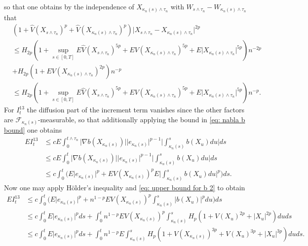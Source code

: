 \documentclass{article}
\begin{document}
so that one obtains by the independence of $X_{\kappa_n(s)\wedge \tau_n}$ with $W_{s\wedge  \tau_n}-W_{\kappa_n(s)\wedge \tau_n}$ that
\begin{align}\label{eq: increment bound V hat}
   &(1+\hat{V}(X_{s\wedge  \tau_n})^p+\hat{V}(X_{\kappa_n(s)\wedge  \tau_n})^p)\lvert X_{s\wedge  \tau_n}-X_{\kappa_n(s)\wedge \tau_n}\rvert^{2p} \nonumber \\
   &\leq H_{2p}(1+\sup_{s\in [0,T]}E\hat{V}(X_{s\wedge  \tau_n})^{5p}+EV(X_{\kappa_n(s)\wedge \tau_n})^{5p}+E\lvert X_{\kappa_n(s)\wedge \tau_n}\rvert^{5p})n^{-2p}\nonumber \\
   &+H_{2p}(1+EV(X_{\kappa_n(s)\wedge \tau_n})^{2p})n^{-p} \nonumber \\
   &\leq H_{2p}(1+\sup_{s\in [0,T]}E\hat{V}(X_{s\wedge  \tau_n})^{5p}+EV(X_{\kappa_n(s)\wedge \tau_n})^{5p}+E\lvert X_{\kappa_n(s)\wedge \tau_n}\rvert^{5p})n^{-p}.
\end{align}
For $I^{13}_t$ the diffusion part of the increment term vanishes since the other factors are $\mathcal{F}_{\kappa_n(s)}$-measurable, so that additionally applying the bound in \eqref{eq: nabla b bound} one obtains
\begin{align}
   EI^{13}_t&\leq c E\int^{t\wedge \tau_n}_0 \lvert \nabla b(X_{\kappa_n(s)}) \rvert  \lvert e_{\kappa_n(s)}\rvert^{p-1} \biggr \lvert \int^s_{\kappa_n(s)}b(X_u) du \biggr \rvert ds\nonumber \\
   &\leq c E\int^t_0 \lvert \nabla b(X_{\kappa_n(s)}) \rvert  \lvert e_{\kappa_n(s)}\rvert^{p-1} \biggr \lvert \int^s_{\kappa_n(s)}b(X_u) du \biggr \rvert ds\nonumber \\
   &\leq c \int^t_0 \biggr (E\lvert e_{\kappa_n(s)}\rvert^p+E V(X_{\kappa_n(s)})  ^{p} E\biggr \lvert \int^s_{\kappa_n(s)}b(X_u) du \biggr \rvert^{p}\biggr) ds.
\end{align}
Now one may apply Hölder's inequality and \eqref{eq: upper bound for b 2} to obtain
\begin{align}
   EI^{13}_t&\leq c \int^t_0 \biggr (E\lvert e_{\kappa_n(s)}\rvert^p+n^{1-p}E V(X_{\kappa_n(s)})  ^{p}   \int^s_{\kappa_n(s)}\lvert b(X_u) \rvert^{p}du  \biggr) ds\nonumber \\
   &\leq c \int^t_0 E\lvert e_{\kappa_n(s)}\rvert^pds+\int^t_0n^{1-p}E V(X_{\kappa_n(s)})  ^{p}   \int^s_{\kappa_n(s)}H_{p}(1+V(X_u)^{2p}+\lvert X_u\rvert^{2p})du   ds\nonumber \\
   &\leq c \int^t_0 E\lvert e_{\kappa_n(s)}\rvert^pds+\int^t_0n^{1-p}E   \int^s_{\kappa_n(s)}H_{p}(1+V(X_{\kappa_n(s)})^{3p}+V(X_u)^{3p}+\lvert X_u\rvert^{3p})du   ds.
\end{align}
\end{document}
